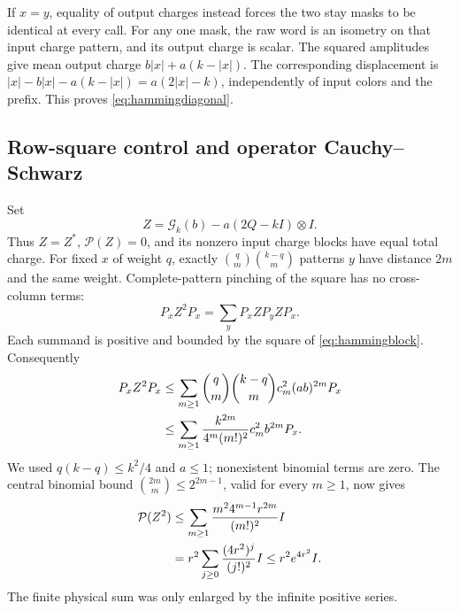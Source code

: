 If $x=y$, equality of output charges instead forces the two stay masks
to be identical at every call. For any one mask, the raw word is an
isometry on that input charge pattern, and its output charge is scalar.
The squared amplitudes give mean output charge
$b|x|+a(k-|x|)$. The corresponding displacement is
$|x|-b|x|-a(k-|x|)=a(2|x|-k)$, independently of input colors and the
prefix. This proves \eqref{eq:hammingdiagonal}.

\subsection{Row-square control and operator Cauchy--Schwarz}

Set
\[
 Z=\mathcal G_k(b)-a(2Q-kI)\otimes I.
\]
Thus $Z=Z^*$, $\mathcal P(Z)=0$, and its nonzero input charge blocks
have equal total charge. For fixed $x$ of weight $q$, exactly
$\binom qm\binom{k-q}m$ patterns $y$ have distance $2m$ and the same
weight. Complete-pattern pinching of the square has no cross-column terms:
\[
 P_xZ^2P_x=\sum_y P_xZP_yZP_x.
\]
Each summand is positive and bounded by the square of
\eqref{eq:hammingblock}. Consequently
\begin{align}
 P_xZ^2P_x
 &\le \sum_{m\ge1}\binom qm\binom{k-q}m
                      c_m^2(ab)^{2m}P_x\notag\\
 &\le \sum_{m\ge1}
       \frac{k^{2m}}{4^m(m!)^2}c_m^2 b^{2m}P_x.
 \label{eq:hammingrows}
\end{align}
We used $q(k-q)\le k^2/4$ and $a\le1$; nonexistent binomial terms
are zero. The central binomial bound
$\binom{2m}{m}\le 2^{2m-1}$, valid for every $m\ge1$, now gives
\begin{align}
 \mathcal P(Z^2)
 &\le\sum_{m\ge1}
       \frac{m^24^{m-1}r^{2m}}{(m!)^2}I\notag\\
 &=r^2\sum_{j\ge0}\frac{(4r^2)^j}{(j!)^2}I
 \le r^2e^{4r^2}I.
 \label{eq:hammingrowmoment}
\end{align}
The finite physical sum was only enlarged by the infinite positive series.


